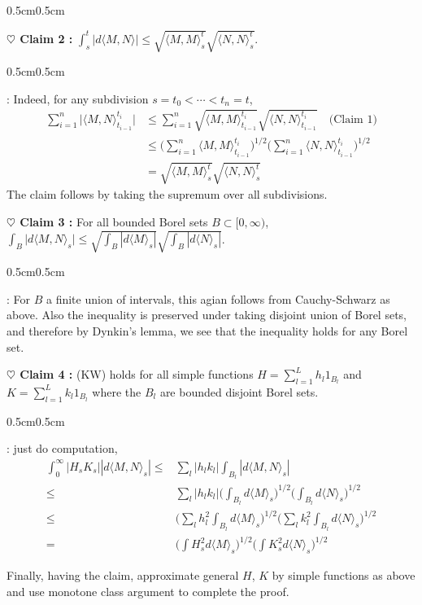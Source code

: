 \documentclass[12pt,a4paper]{article}
\newenvironment{proof}
{\begin{changemargin}{0.5cm}{0.5cm} 
	}%
	{\end{changemargin}
}
\newenvironment{subproof}
{\begin{changemargin}{0.5cm}{0.5cm} 
	}%
	{\end{changemargin}
}
\newenvironment{p}
{\begin{proof} 
	}%
	{\end{proof}
}
\begin{document}
\begin{p}
\textbf{$\heartsuit$ Claim 2 :} $\int_s^t |d\langle M, N \rangle| \leq \sqrt{\langle M, M \rangle_s^t} \sqrt{\langle N,N \rangle_s^t}$.
\begin{subproof}
: Indeed, for any subdivision $s=t_0 < \cdots < t_n =t$,
\begin{align*}
\sum_{i=1}^n \big| \langle M, N \rangle_{t_{i-1}}^{t_i} \big| &\leq \sum_{i=1}^n \sqrt{\langle M, M \rangle_{t_{i-1}}^{t_i}} \sqrt{\langle N, N \rangle_{t_{i-1}}^{t_i}} \quad \text{(Claim 1)}\\
&\leq \Big(\sum_{i=1}^n \langle M, M \rangle_{t_{i-1}}^{t_i}\Big)^{1/2} \Big(\sum_{i=1}^n \langle N, N \rangle_{t_{i-1}}^{t_i}\Big)^{1/2} \\
&=\sqrt{\langle M, M \rangle_s^t} \sqrt{\langle N, N \rangle_s^t}
\end{align*}
The claim follows by taking the supremum over all subdivisions.
\end{subproof}
\textbf{$\heartsuit$ Claim 3 :} For all bounded Borel sets $B\subset [0, \infty)$, $\int_B \big| d\langle M, N \rangle_s \big| \leq \sqrt{\int_B |d\langle M\rangle_s|} \sqrt{\int_B |d\langle N\rangle_s|}$. 
\begin{subproof}
: For $B$ a finite union of intervals, this agian follows from Cauchy-Schwarz as above. Also the inequality is preserved under taking disjoint union of Borel sets, and therefore by Dynkin's lemma, we see that the inequality holds for any Borel set.
\end{subproof}
\textbf{$\heartsuit$ Claim 4 :} (KW) holds for all simple functions $H= \sum_{l=1}^L h_l 1_{B_l}$ and $K= \sum_{l=1}^L k_l 1_{B_l}$ where the $B_l$ are bounded disjoint Borel sets.
\begin{subproof}
: just do computation,
\begin{align*}
\int_0^{\infty} |H_s K_s| |d\langle M, N \rangle_s| \leq & \sum_{l} |h_l k_l| \int_{B_l} |d\langle M, N \rangle_s| \\
\leq & \sum_l |h_l k_l| \Big(\int_{B_l} d\langle M \rangle_s\Big)^{1/2} \Big(\int_{B_l} d\langle N \rangle_s\Big)^{1/2} \\
\leq & \Big( \sum_l h_l^2 \int_{B_l} d\langle M \rangle_s \Big)^{1/2} \Big( \sum_l k_l^2 \int_{B_l} d\langle N \rangle_s \Big)^{1/2} \\
= & \Big( \int H_s^2 d\langle M \rangle_s \Big)^{1/2} \Big( \int K_s^2 d\langle N \rangle_s \Big)^{1/2} 
\end{align*}
\end{subproof}
Finally, having the claim, approximate general $H$, $K$ by simple functions as above and use monotone class argument to complete the proof.

\eop
\end{p}
\end{document}

